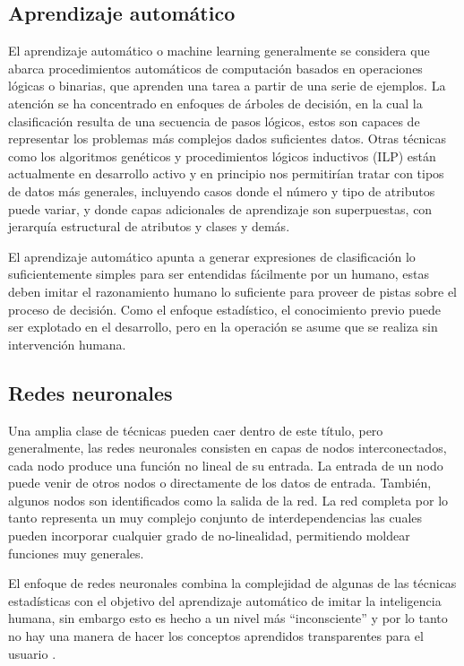 \subsection{Aprendizaje automático}
El aprendizaje automático o machine learning generalmente se considera que abarca procedimientos automáticos de computación basados en operaciones lógicas o binarias, que aprenden una tarea a partir de una serie de ejemplos.
La atención se ha concentrado en enfoques de árboles de decisión, en la cual la clasificación resulta de una secuencia de pasos lógicos, estos son capaces de representar los problemas más complejos dados suficientes datos.
Otras técnicas como los algoritmos genéticos y procedimientos lógicos inductivos (ILP) están actualmente en desarrollo activo y en principio nos permitirían tratar con tipos de datos más generales, incluyendo casos donde el número y tipo de atributos puede variar, y donde capas adicionales de aprendizaje son superpuestas, con jerarquía estructural de atributos y clases y demás. 

El aprendizaje automático apunta a generar expresiones de clasificación lo suficientemente simples para ser entendidas fácilmente por un humano, estas deben imitar el razonamiento humano lo suficiente para proveer de pistas sobre el proceso de decisión. 
Como el enfoque estadístico, el conocimiento previo puede ser explotado en el desarrollo, pero en la operación se asume que se realiza sin intervención humana.

\subsection{Redes neuronales}
Una amplia clase de técnicas pueden caer dentro de este título, pero generalmente, las redes neuronales consisten en capas de nodos interconectados, cada nodo produce una función no lineal de su entrada. La entrada de un nodo puede venir de otros nodos o directamente de los datos de entrada. También, algunos nodos son identificados como la salida de la red. La red completa por lo tanto representa un muy complejo conjunto de interdependencias las cuales pueden incorporar cualquier grado de no-linealidad, permitiendo moldear funciones muy generales. 

El enfoque de redes neuronales combina la complejidad de algunas de las técnicas estadísticas con el objetivo del aprendizaje automático de imitar la inteligencia humana, sin embargo esto es hecho a un nivel más ``inconsciente'' y por lo tanto no hay una manera de hacer los conceptos aprendidos transparentes para el usuario \cite{Michie94machinelearning}.

